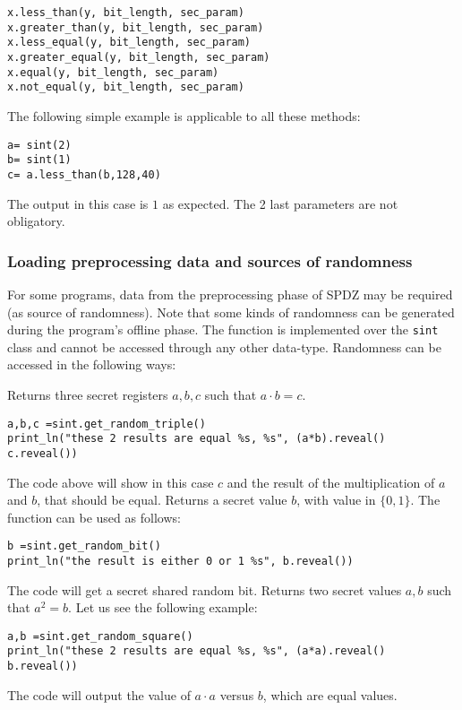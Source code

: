 \begin{lstlisting}
x.less_than(y, bit_length, sec_param)
x.greater_than(y, bit_length, sec_param)
x.less_equal(y, bit_length, sec_param)
x.greater_equal(y, bit_length, sec_param)
x.equal(y, bit_length, sec_param)
x.not_equal(y, bit_length, sec_param)
\end{lstlisting}

\noindent
The following simple example is applicable to all these methods: 
\begin{lstlisting}
a= sint(2)
b= sint(1)
c= a.less_than(b,128,40)
\end{lstlisting}
The output in this case is $1$ as expected. The 2 last parameters are not obligatory.


\subsubsection{Loading preprocessing data and sources of randomness}

For some programs, data from the preprocessing phase of SPDZ may be required (as source of randomness). Note that some kinds of randomness can  be generated during the program's offline phase. The function is implemented over the \verb|sint| class and cannot be accessed through any other data-type. Randomness can be accessed in the following ways:

Returns three secret registers $a, b, c$ such that $a\cdot b = c$.
\begin{lstlisting}
a,b,c =sint.get_random_triple()
print_ln("these 2 results are equal %s, %s", (a*b).reveal() c.reveal())
\end{lstlisting}
The code above will show in this case $c$ and the result of the multiplication of $a$ and $b$, that should be equal.
Returns a secret value $b$, with value in $\{0, 1\}$. The function can be used as follows:
\begin{lstlisting}
b =sint.get_random_bit()
print_ln("the result is either 0 or 1 %s", b.reveal())
\end{lstlisting}
The code will get a secret shared random bit.
Returns two secret values $a, b$ such that $a^2 = b$. Let us see the following example: 
\begin{lstlisting}
a,b =sint.get_random_square()
print_ln("these 2 results are equal %s, %s", (a*a).reveal() b.reveal())
\end{lstlisting}
The code will output the value of $a \cdot a$ versus $b$,  which are equal values. 

